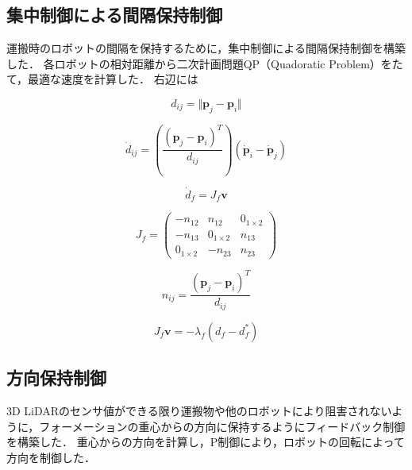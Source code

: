 \documentclass[a4jsme]{jsmepaper}
\begin{document}
\subsection{集中制御による間隔保持制御}
運搬時のロボットの間隔を保持するために，集中制御による間隔保持制御を構築した．
各ロボットの相対距離から二次計画問題QP（Quadoratic Problem）をたて，最適な速度を計算した．
右辺には

\begin{equation}
   d_{ij} = \Vert \mathbf{p}_j - \mathbf{p}_i \Vert
\label{eq:distance_between_robots}
\end{equation}

\begin{equation}
   \dot{d}_{ij} = \left( \frac{(\mathbf{p}_j - \mathbf{p}_i)^T}{d_{ij}} \right) \left( \dot{\mathbf{p}}_i - \dot{\mathbf{p}}_j \right)
\label{eq:velocity_difference}
\end{equation}

\begin{equation}
   \dot{d}_f = J_f \mathbf{v}
\label{eq:formation_jacobian}
\end{equation}

\begin{equation}
   J_f =
   \begin{pmatrix}
   -n_{12} & n_{12} & 0_{1\times 2}  \\
   -n_{13} & 0_{1\times 2} & n_{13}  \\
   0_{1\times 2} & -n_{23} & n_{23}
   \end{pmatrix}
\label{eq:jacobian_matrix}
\end{equation}

\begin{equation}
   n_{ij} = \frac{(\mathbf{p}_j - \mathbf{p}_i)^T}{d_{ij}}
\label{eq:n_ij_definition}
\end{equation}

\begin{equation}
   J_f \mathbf{v} = -\lambda_f \left( d_f - d_f^* \right)
\label{eq:formation_control}
\end{equation}


\subsection{方向保持制御}
3D LiDARのセンサ値ができる限り運搬物や他のロボットにより阻害されないように，フォーメーションの重心からの方向に保持するようにフィードバック制御を構築した．
重心からの方向を計算し，P制御により，ロボットの回転によって方向を制御した．
\end{document}
